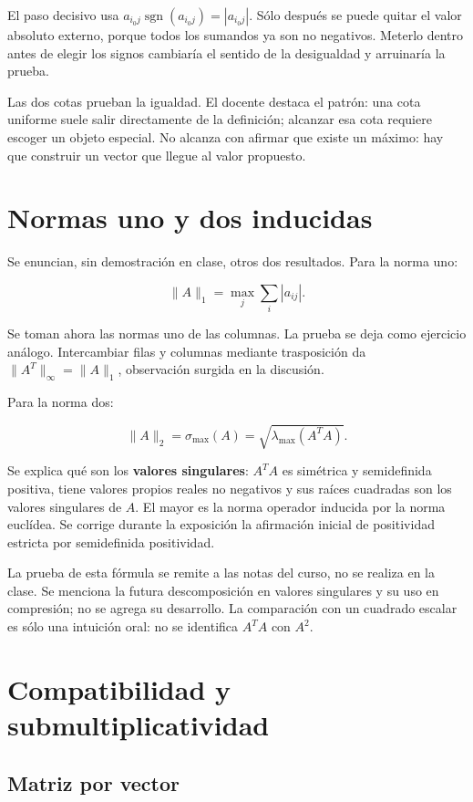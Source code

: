 \documentclass[12pt,a4paper]{article}
\begin{document}
El paso decisivo usa $a_{i_0j}\operatorname{sgn}(a_{i_0j})=|a_{i_0j}|$. Sólo después se puede quitar el valor absoluto externo, porque todos los sumandos ya son no negativos. Meterlo dentro antes de elegir los signos cambiaría el sentido de la desigualdad y arruinaría la prueba.

Las dos cotas prueban la igualdad. El docente destaca el patrón: una cota uniforme suele salir directamente de la definición; alcanzar esa cota requiere escoger un objeto especial. No alcanza con afirmar que existe un máximo: hay que construir un vector que llegue al valor propuesto.

\section{Normas uno y dos inducidas}

Se enuncian, sin demostración en clase, otros dos resultados. Para la norma uno:

\[
\boxed{\|A\|_1=\max_j\sum_i|a_{ij}|}.
\]

Se toman ahora las normas uno de las columnas. La prueba se deja como ejercicio análogo. Intercambiar filas y columnas mediante trasposición da $\|A^T\|_\infty=\|A\|_1$, observación surgida en la discusión.

Para la norma dos:

\[
\boxed{\|A\|_2=\sigma_{\max}(A)
=\sqrt{\lambda_{\max}(A^TA)}}.
\]

Se explica qué son los \textbf{valores singulares}: $A^TA$ es simétrica y semidefinida positiva, tiene valores propios reales no negativos y sus raíces cuadradas son los valores singulares de $A$. El mayor es la norma operador inducida por la norma euclídea. Se corrige durante la exposición la afirmación inicial de positividad estricta por semidefinida positividad.

La prueba de esta fórmula se remite a las notas del curso, no se realiza en la clase. Se menciona la futura descomposición en valores singulares y su uso en compresión; no se agrega su desarrollo. La comparación con un cuadrado escalar es sólo una intuición oral: no se identifica $A^TA$ con $A^2$.

\section{Compatibilidad y submultiplicatividad}

\subsection{Matriz por vector}
\end{document}
